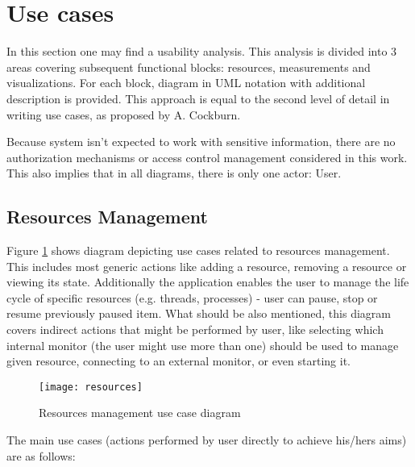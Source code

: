 %
\section{Use cases}
\label{sec:ch4_usecases}

In this section one may find a usability analysis. This analysis is divided into 3 areas covering subsequent functional blocks: resources, measurements and visualizations. For each block, diagram in UML notation with additional description is provided. This approach is equal to the second level of detail in writing use cases, as proposed by A. Cockburn\cite{0201702258}. 

Because system isn't expected to work with sensitive information, there are no authorization mechanisms or access control management considered in this work. This also implies that in all diagrams, there is only one actor: User.

\subsection{Resources Management}
\label{subsec:resources_mgmnt}

Figure \ref{fig:usecase_resources} shows diagram depicting use cases related to resources management. This includes most generic actions like adding a resource, removing a resource or viewing its state. Additionally the application enables the user to manage the life cycle of specific resources (e.g. threads, processes) - user can pause, stop or resume previously paused item. What should be also mentioned, this diagram covers indirect actions that might be performed by user, like selecting which internal monitor (the user might use more than one) should be used to manage given resource, connecting to an external monitor, or even starting it.

\begin{figure}[ht]
\centering
\texttt{[image: resources]}
\caption{Resources management use case diagram}
\label{fig:usecase_resources}
\end{figure}

The main use cases (actions performed by user directly to achieve his/hers aims) are as follows:

